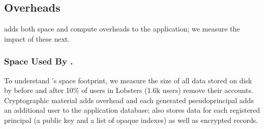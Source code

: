 \subsection{\sys Overheads}
\label{s:eval-overheads}

\sys adds both space and compute overheads to the application; we measure the
impact of these next.

\subsubsection{Space Used By \sys.}
%
To understand \sys's space footprint, we measure the size of all data stored
on disk by \sys before and after 10\% of users in Lobsters (1.6k users)
remove their accounts.
%
%
Cryptographic material adds overhead and each generated pseudoprincipal adds an
additional user to the application database; \sys also stores data for each
registered principal (a public key and a list of opaque indexes) as well as
encrypted records.
%


